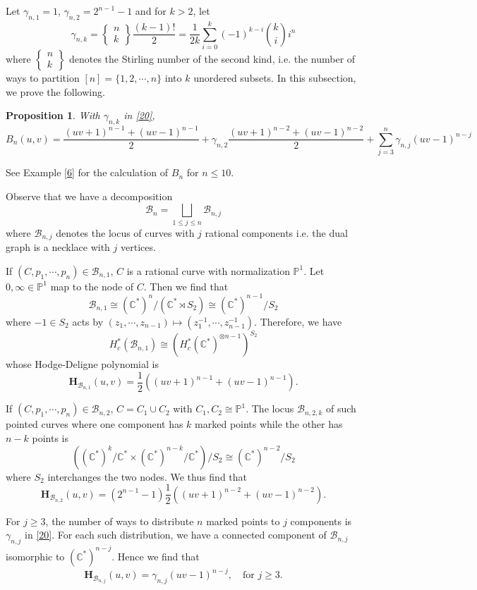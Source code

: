 \documentclass[11pt]{amsart}
\numberwithin{equation}{section}
\newtheorem{prop}[theo]{Proposition}
\theoremstyle{definition}
\newcommand{\CC}{\mathbb{C}}
\newcommand{\PP}{\mathbb{P}}
\newcommand{\bH}{\mathbf{H}}
\def\cB{{\mathcal B}}
\def\and{\quad{\rm and}\quad}
\def\beq{\begin{equation}}
\def\eeq{\end{equation}}
\begin{document}
Let $\gamma_{n,1}=1$, $\gamma_{n,2}=2^{n-1}-1$ and for $k>2$, let \beq\label{20} \gamma_{n,k} =\left\{\begin{matrix} n\\ k\end{matrix}\right\}\frac{(k-1)!}{2} = \frac{1}{2k} \sum_{i=0}^k (-1)^{k-i} \binom{k}{i} i^n\eeq
where $\left\{\begin{matrix} n\\ k\end{matrix}\right\}$ denotes the Stirling number of the second kind, i.e. the number of ways to partition $[n]=\{1,2,\cdots,n\}$ into $k$ unordered subsets. 
In this subsection, we prove the following. 
\begin{prop}\label{4} %
With $\gamma_{n,k}$ in \eqref{20}, 
\[
B_n(u,v) = \frac{(uv+1)^{n-1}+(uv-1)^{n-1}}{2} + \gamma_{n,2} \frac{(uv+1)^{n-2}+(uv-1)^{n-2}}{2} + \sum_{j=3}^n \gamma_{n,j} (uv-1)^{n-j}
\]
\end{prop}
See Example \ref{6} for the calculation of $B_n$ for $n\le 10$. 

\medskip

Observe that we have a decomposition $$\cB_n=\bigsqcup_{1\le j\le n}\cB_{n,j}$$ where 
$\cB_{n,j}$ denotes the locus of curves with $j$ rational components i.e. the dual graph is a necklace with $j$ vertices.

If $(C,p_1,\cdots, p_n)\in \cB_{n,1}$, $C$ is a rational curve with  normalization $\PP^1$. Let $0,\infty\in \PP^1$ map to the node of $C$. Then 
we find that 
$$\cB_{n,1}\cong (\CC^*)^n/(\CC^*\rtimes S_2)\cong (\CC^*)^{n-1}/S_2$$
where $-1\in S_2$ acts by $(z_1,\cdots,z_{n-1})\mapsto (z_1^{-1},\cdots,z_{n-1}^{-1}).$
Therefore, we have $$H^*_c(\cB_{n,1})\cong (H^*_c(\CC^*)^{\otimes n-1})^{S_2}$$
whose Hodge-Deligne polynomial is 
\beq\label{28}
\bH_{\cB_{n,1}}(u,v)=\frac12\left( (uv+1)^{n-1} + (uv-1)^{n-1} \right).\eeq

If $(C,p_1,\cdots,p_n)\in \cB_{n,2}$, $C=C_1\cup C_2$ with $C_1,C_2\cong \PP^1$.
The locus $\cB_{n,2,k}$ of such pointed curves where one component has $k$ marked points while the other has $n-k$ points is 
$$((\CC^*)^k/\CC^*\times (\CC^*)^{n-k}/\CC^*)/S_2\cong (\CC^*)^{n-2}/S_2$$
where $S_2$ interchanges the two nodes. We thus find that 
\beq\label{29}
\bH_{\cB_{n,2}}(u,v)=(2^{n-1}-1) \frac12\left( (uv+1)^{n-2} + (uv-1)^{n-2} \right).\eeq

For $j\ge 3$, the number of ways to distribute $n$ marked points to $j$ components is $\gamma_{n,j}$ in \eqref{20}. For each such distribution, we have a connected component of $\cB_{n,j}$ isomorphic to $(\CC^*)^{n-j}$. Hence we find that 
\beq\label{30}
\bH_{\cB_{n,j}}(u,v) = \gamma_{n,j}(uv-1)^{n-j},\quad \text{for } j\ge 3.\eeq
\end{document}
